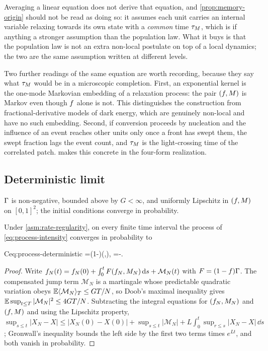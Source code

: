 Averaging a linear equation does not derive that equation, and
\cref{prop:memory-origin} should not be read as doing so: it assumes each unit
carries an internal variable relaxing towards its own state with a
\emph{common} time $\tau_{M}$, which is if anything a stronger assumption than the
population law. What it buys is that the population law is not an extra
non-local postulate on top of a local dynamics; the two are the same
assumption written at different levels.

Two further readings of the same equation are worth recording, because they
say what $\tau_{M}$ would be in a microscopic completion. First, an exponential
kernel is the one-mode Markovian embedding of a relaxation process: the pair
$(f,M)$ is Markov even though $f$ alone is not. This
distinguishes the construction from fractional-derivative
models of dark energy, which are genuinely non-local and have no such
embedding. Second, if conversion proceeds by nucleation and the influence of
an event reaches other units only once a front has swept them, the swept
fraction lags the event count, and $\tau_{M}$ is the light-crossing time of the
correlated patch.  makes this concrete in the four-form
realization.

\subsection{Deterministic limit}\label{sec:process-limit}

\begin{assumption}\label{asm:rate-regularity}
  $\Gamma$ is non-negative, bounded above by $G<\infty$, and uniformly Lipschitz
  in $(f,M)$ on $[0,1]^2$; the initial conditions converge in
  probability.
\end{assumption}

\begin{theorem}\label{thm:deterministic-limit}
  Under \cref{asm:rate-regularity}, on every finite time interval the process
  of \cref{eq:process-intensity} converges in probability to
  \begin{keyresult}{C}{eq:process-deterministic}
    \dot \fconv=(1-\fconv)\Gam(\fconv,\Mmem),
    \qquad \tauM\dot \Mmem=\fconv-\Mmem .
  \end{keyresult}
\end{theorem}

\begin{proof}
  Write $f_N(t)=f_N(0)+\int_0^t F(f_N,M_N)\,\mathrm{d} s+\mathcal
  M_N(t)$ with $F=(1-f)\Gamma$. The compensated jump term $\mathcal M_N$ is
  a martingale whose predictable quadratic variation obeys
  $\mathbb{E}\langle\mathcal M_N\rangle_T\le GT/N$, so Doob's maximal inequality gives
  $\mathbb{E}\sup_{t\le T}|\mathcal M_N|^2\le 4GT/N$. Subtracting the integral
  equations for $(f_N,M_N)$ and $(f,M)$ and using the
  Lipschitz property,
  $\sup_{s\le t}|X_N-X|\le|X_N(0)-X(0)|+\sup_{s\le t}|\mathcal M_N|
  +L\int_0^t\sup_{r\le s}|X_N-X|\,\dd s$; Gronwall's inequality bounds the left
  side by the first two terms times $e^{Lt}$, and both vanish in probability.
\end{proof}

